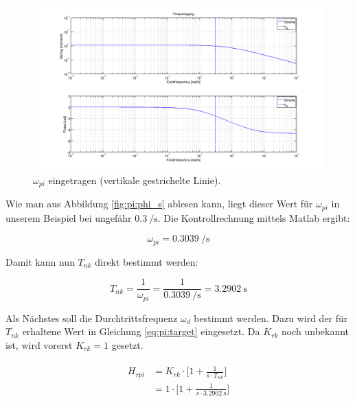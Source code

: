 \begin{figure}[h! width=\pagewidth]
    \includegraphics[width=\textwidth]{images/piStreckeOmegaPI.png}
    \caption{%
        $\omega_{pi}$ eingetragen (vertikale gestrichelte Linie).
    }
    \label{fig:pi:omega_pi}
\end{figure}

Wie man aus Abbildung \ref{fig:pi:phi_s} ablesen kann, liegt dieser Wert f\"ur
$\omega_{pi}$ in unserem  Beispiel bei ungef\"ahr $\SI{0.3}{\per\second}$. Die
Kontrollrechnung mittels Matlab ergibt:

\begin{equation} \label{eq:pi:omega_pi}
    \omega_{pi} = \SI{0.3039}{\per\second}
\end{equation}

Damit kann nun $T_{nk}$ direkt bestimmt werden\footnotemark[1]:

\begin{equation} \label{eq:pi:omega_pi}
    T_{nk} = \frac{1}{\omega_{pi}} = \frac{1}{\SI{0.3039}{\per\second}} = \SI{3.2902}{\second}
\end{equation}


Als N\"achstes  soll die Durchtrittsfrequenz $\omega_d$  bestimmt werden. Dazu
wird  der  f\"ur  $T_{nk}$  erhaltene  Wert  in  Gleichung  \ref{eq:pi:target}
eingesetzt. Da $K_{rk}$ noch unbekannt ist, wird vorerst $K_{rk} = 1$ gesetzt.

\begin{gather} \label{eq:pi:target}
    \begin{split}
        H_{rpi} & = K_{rk} \cdot \biggl[ 1 + \frac{1}{s \cdot T_{nk}} \biggr] \\
                & = 1      \cdot \biggl[ 1 + \frac{1}{s \cdot \SI{3.2902}{\second}} \biggr]
    \end{split}
\end{gather}

